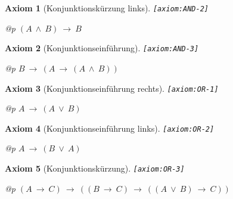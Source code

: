 \documentclass[a4paper,german,10pt,twoside]{book}
\newtheorem{ax}{Axiom}
\theoremstyle{definition}
\theoremstyle{remark}
\begin{document}
\begin{ax}[Konjunktionsk{\"u}rzung links]
\label{axiom:AND-2} \hypertarget{axiom:AND-2}{}
{\tt \tiny [\verb]axiom:AND-2]]}
\mbox{}
\begin{longtable}{{@{\extracolsep{\fill}}p{\linewidth}}}
\centering $(A\ \land\ B)\ \rightarrow\ B$
\end{longtable}

\end{ax}


\begin{ax}[Konjunktionseinf{\"u}hrung]
\label{axiom:AND-3} \hypertarget{axiom:AND-3}{}
{\tt \tiny [\verb]axiom:AND-3]]}
\mbox{}
\begin{longtable}{{@{\extracolsep{\fill}}p{\linewidth}}}
\centering $B\ \rightarrow\ (A\ \rightarrow\ (A\ \land\ B))$
\end{longtable}

\end{ax}


\begin{ax}[Konjunktionseinf{\"u}hrung rechts]
\label{axiom:OR-1} \hypertarget{axiom:OR-1}{}
{\tt \tiny [\verb]axiom:OR-1]]}
\mbox{}
\begin{longtable}{{@{\extracolsep{\fill}}p{\linewidth}}}
\centering $A\ \rightarrow\ (A\ \lor\ B)$
\end{longtable}

\end{ax}


\begin{ax}[Konjunktionseinf{\"u}hrung links]
\label{axiom:OR-2} \hypertarget{axiom:OR-2}{}
{\tt \tiny [\verb]axiom:OR-2]]}
\mbox{}
\begin{longtable}{{@{\extracolsep{\fill}}p{\linewidth}}}
\centering $A\ \rightarrow\ (B\ \lor\ A)$
\end{longtable}

\end{ax}


\begin{ax}[Konjunktionsk{\"u}rzung]
\label{axiom:OR-3} \hypertarget{axiom:OR-3}{}
{\tt \tiny [\verb]axiom:OR-3]]}
\mbox{}
\begin{longtable}{{@{\extracolsep{\fill}}p{\linewidth}}}
\centering $(A\ \rightarrow\ C)\ \rightarrow\ ((B\ \rightarrow\ C)\ \rightarrow\ ((A\ \lor\ B)\ \rightarrow\ C))$
\end{longtable}

\end{ax}
\end{document}
